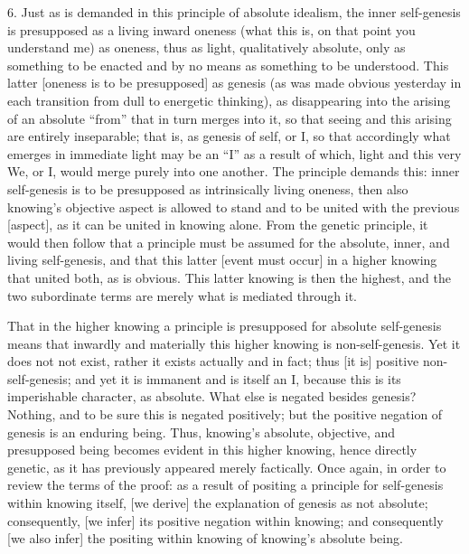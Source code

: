 6. Just as is demanded in this principle of absolute idealism,
the inner self-genesis is presupposed
as a living inward oneness
(what this is, on that point you understand me)
as oneness, thus as light, qualitatively absolute,
only as something to be enacted
and by no means as something to be understood.
This latter [oneness is to be presupposed] as genesis
(as was made obvious yesterday in each transition
from dull to energetic thinking),
as disappearing into the arising
of an absolute “from”
that in turn merges into it,
so that seeing and this arising are entirely inseparable;
that is, as genesis of self, or I,
so that accordingly what emerges in immediate light
may be an “I” as a result of which,
light and this very We, or I,
would merge purely into one another.
The principle demands this:
inner self-genesis is to be presupposed
as intrinsically living oneness,
then also knowing's objective aspect is
allowed to stand and to be united
with the previous [aspect],
as it can be united in knowing alone.
From the genetic principle,
it would then follow that a principle must be assumed for
the absolute, inner, and living self-genesis,
and that this latter [event must occur]
in a higher knowing that united both, as is obvious.
This latter knowing is then the highest,
and the two subordinate terms are
merely what is mediated through it.

That in the higher knowing
a principle is presupposed
for absolute self-genesis
means that inwardly and materially
this higher knowing is non-self-genesis.
Yet it does not not exist,
rather it exists actually and in fact;
thus [it is] positive non-self-genesis;
and yet it is immanent and is itself an I,
because this is its imperishable character, as absolute.
What else is negated besides genesis?
Nothing, and to be sure this is negated positively;
but the positive negation of genesis is an enduring being.
Thus, knowing's absolute, objective,
and presupposed being becomes evident
in this higher knowing, hence directly genetic,
as it has previously appeared merely factically.
Once again, in order to review the terms of the proof:
as a result of positing a principle
for self-genesis within knowing itself,
[we derive] the explanation of genesis as not absolute;
consequently, [we infer] its positive negation within knowing;
and consequently [we also infer] the positing within knowing
of knowing's absolute being.

